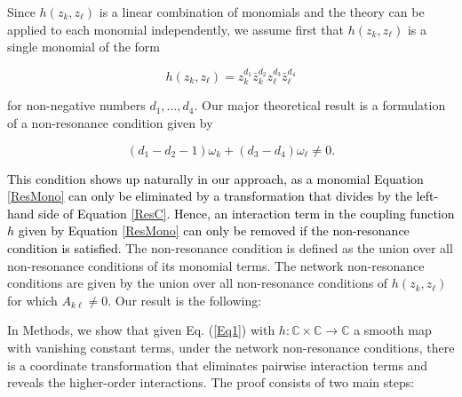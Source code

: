 \documentclass[12pt]{article}
\theoremstyle{plain}
\theoremstyle{definition}
\theoremstyle{remark}
\theoremstyle{remark}
\begin{document}
Since $h(z_k, z_{\ell})$ is a linear combination of monomials and the theory can be applied to each monomial independently, we assume first that $h(z_k, z_{\ell})$ is a single monomial of the form 
\begin{linenomath}
\begin{equation}\label{ResMono}
h(z_k, z_{\ell})  = z_k^{d_1}\bar{z}_k^{d_2}z_{\ell}^{d_3}\bar{z}_{\ell}^{d_4}
\end{equation}
\end{linenomath}
for non-negative numbers $d_1, \dots, d_4$. {\color{black} Our major theoretical result is a formulation}  of a non-resonance condition   given by
\begin{linenomath}
\begin{equation}\label{ResC}
(d_1 - d_2 -1)\omega_k + (d_3 - d_4)\omega_{\ell} \not= 0.
\end{equation}
\end{linenomath}
\textcolor{black}{This condition shows up naturally in our approach, as a monomial Equation \eqref{ResMono} can only be eliminated by a transformation that divides by the left-hand side of Equation \eqref{ResC}. Hence, an interaction term in the coupling function $h$ given by Equation \eqref{ResMono} can only be removed if the non-resonance condition is satisfied.}
The non-resonance condition is defined as the union over all non-resonance conditions of its monomial terms. The network non-resonance conditions are given by the union over all non-resonance conditions of $h(z_k, z_{\ell})$
for which $A_{{k \ell}} \not= 0$. Our result is the following:
 

{In Methods, we show that given Eq. (\ref{Eq1}) with  $h: \mathbb{C} \times \mathbb{C} \rightarrow \mathbb{C}$ a smooth map with vanishing constant terms, under the network non-resonance conditions, there is a coordinate transformation that eliminates pairwise interaction terms and reveals  the higher-order  interactions.} 
The proof consists of two main steps:
\end{document}
